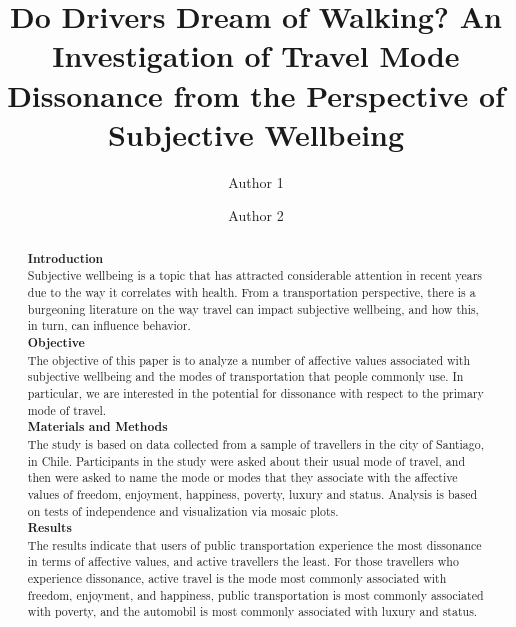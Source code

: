 \documentclass[]{elsarticle} %
\begin{document}
\begin{frontmatter}

  \title{Do Drivers Dream of Walking? An Investigation of Travel Mode Dissonance
from the Perspective of Subjective Wellbeing}
    \author[Some University]{Author 1}
    \author[Some School]{Author 2}
  
      \address[Some University]{Department, Street, City, State, Zip}
    \address[Some School]{Department, Street, City, State, Zip}
  
  \begin{abstract}
  \textbf{Introduction}\\
  Subjective wellbeing is a topic that has attracted considerable
  attention in recent years due to the way it correlates with health. From
  a transportation perspective, there is a burgeoning literature on the
  way travel can impact subjective wellbeing, and how this, in turn, can
  influence behavior.\\
  \textbf{Objective}\\
  The objective of this paper is to analyze a number of affective values
  associated with subjective wellbeing and the modes of transportation
  that people commonly use. In particular, we are interested in the
  potential for dissonance with respect to the primary mode of travel.\\
  \textbf{Materials and Methods}\\
  The study is based on data collected from a sample of travellers in the
  city of Santiago, in Chile. Participants in the study were asked about
  their usual mode of travel, and then were asked to name the mode or
  modes that they associate with the affective values of freedom,
  enjoyment, happiness, poverty, luxury and status. Analysis is based on
  tests of independence and visualization via mosaic plots.\\
  \textbf{Results}\\
  The results indicate that users of public transportation experience the
  most dissonance in terms of affective values, and active travellers the
  least. For those travellers who experience dissonance, active travel is
  the mode most commonly associated with freedom, enjoyment, and
  happiness, public transportation is most commonly associated with
  poverty, and the automobil is most commonly associated with luxury and
  status.
  \end{abstract}
  
 \end{frontmatter}
\end{document}
